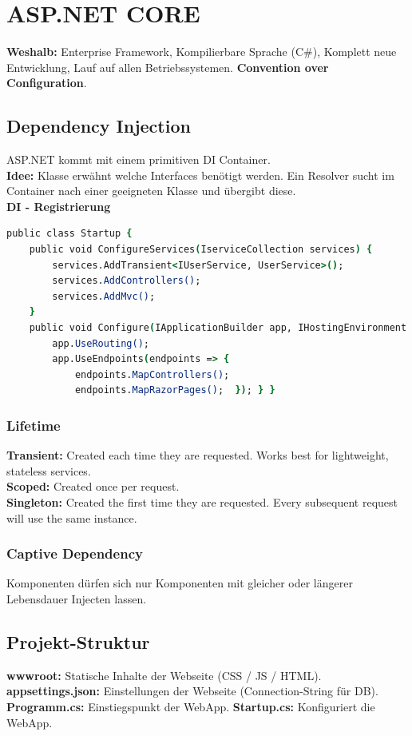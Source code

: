 
\section{ASP.NET CORE}
\textbf{Weshalb:} Enterprise Framework, Kompilierbare Sprache (C\#), Komplett neue Entwicklung, Lauf auf allen Betriebssystemen.
\textbf{Convention over Configuration}.

\subsection{Dependency Injection}
ASP.NET kommt mit einem primitiven DI Container.\\
\textbf{Idee:} Klasse erwähnt welche Interfaces benötigt werden.
Ein Resolver sucht im Container nach einer geeigneten Klasse und übergibt diese.\\
\textbf{DI - Registrierung}
\begin{lstlisting}[language=csh]
public class Startup {
    public void ConfigureServices(IserviceCollection services) {
        services.AddTransient<IUserService, UserService>();
        services.AddControllers();
        services.AddMvc();
    }
    public void Configure(IApplicationBuilder app, IHostingEnvironment env) {
        app.UseRouting();
        app.UseEndpoints(endpoints => {
            endpoints.MapControllers();
            endpoints.MapRazorPages();  }); } }
\end{lstlisting}
\subsubsection{Lifetime}
\textbf{Transient:} Created each time they are requested.
Works best for lightweight, stateless services.\\
\textbf{Scoped:} Created once per request.\\
\textbf{Singleton:} Created the first time they are requested.
Every subsequent request will use the same instance.\\
\subsubsection{Captive Dependency}
Komponenten dürfen sich nur Komponenten mit gleicher oder längerer Lebensdauer Injecten lassen.

\subsection{Projekt-Struktur}
\textbf{wwwroot:} Statische Inhalte der Webseite (CSS / JS / HTML).
\textbf{appsettings.json:} Einstellungen der Webseite (Connection-String für DB).
\textbf{Programm.cs:} Einstiegspunkt der WebApp.
\textbf{Startup.cs:} Konfiguriert die WebApp.

